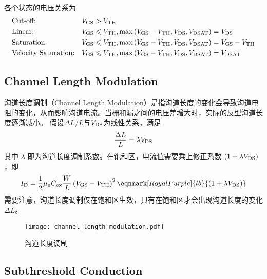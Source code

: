 各个状态的电压关系为
\begin{equation}
    \begin{aligned}
        & \text{Cut-off:} && V_{\rm{GS}} > V_{\rm{TH}} \\
        & \text{Linear:} && V_{\rm{GS}} \leqslant V_{\rm{TH}}, \max \left(V_{\rm{GS}} - V_{\rm{TH}}, V_{\rm{DS}}, V_{\rm{DSAT}}\right) = V_{\rm{DS}} \\
        & \text{Saturation:} && V_{\rm{GS}} \leqslant V_{\rm{TH}}, \max \left(V_{\rm{GS}} - V_{\rm{TH}}, V_{\rm{DS}}, V_{\rm{DSAT}}\right) = V_{\rm{GS}} - V_{\rm{TH}} \\
        & \text{Velocity Saturation:} && V_{\rm{GS}} \leqslant V_{\rm{TH}}, \max \left(V_{\rm{GS}} - V_{\rm{TH}}, V_{\rm{DS}}, V_{\rm{DSAT}}\right) = V_{\rm{DSAT}}
    \end{aligned}
\end{equation}

\subsection{Channel Length Modulation}
沟道长度调制（Channel Length Modulation）是指沟道长度的变化会导致沟道电阻的变化，从而影响沟道电流。当栅和漏之间的电压差增大时，实际的反型沟道长度逐渐减小。
假设$\Delta L / L$与$V_{\rm{DS}}$为线性关系，满足
\begin{equation}
    \frac{\Delta L}{L} = \lambda V_{\rm{DS}}
\end{equation}
其中 $\lambda$ 即为沟道长度调制系数。在饱和区，电流值需要乘上修正系数 $\left(1 + \lambda V_{\rm{DS}}\right)$，即
\begin{equation}
    I_{\rm{D}} = \frac{1}{2} \mu_{\rm{n}} C_{\rm{ox}} \frac{W}{L} \left( V_{\rm{GS}} - V_{\rm{TH}} \right)^2 \eqnmark[RoyalPurple]{lb}{\left( 1 + \lambda V_{\rm{DS}} \right)}
\end{equation}
需要注意，沟道长度调制仅在饱和区生效，只有在饱和区才会出现沟道长度的变化$\Delta L$。

\begin{figure}
    \centering
    \texttt{[image: channel\_length\_modulation.pdf]}
    \caption{沟道长度调制\cite{NeamenSemiconductor}}
    \label{fig:channel_length_modulation}
\end{figure}

\subsection{Subthreshold Conduction}

